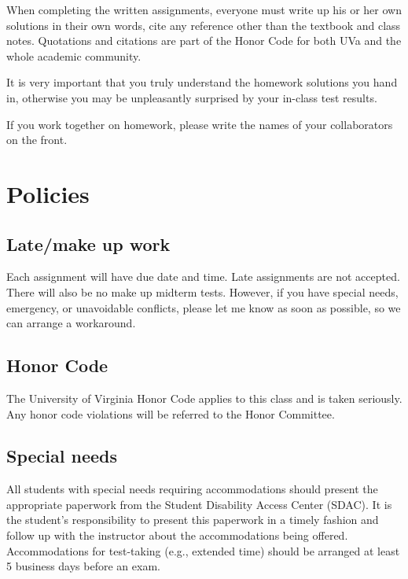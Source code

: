 \documentclass[oneside,11pt]{amsart}
\begin{document}
When completing the written assignments, everyone must write up his or her own solutions in their own words, cite any reference other than the textbook and class notes. Quotations and citations are part of the Honor Code for both UVa and the whole academic community. 

It is very important that you truly understand the homework solutions you hand in, otherwise you may be unpleasantly surprised by your in-class test results.

If you work together on homework, please write the names of your collaborators on the front.

\label{academic_integrity}

\section{Policies}

\subsection{Late/make up work}
Each assignment will have due date and time. Late assignments are not accepted. There will also be no make up midterm tests. However, if you have special needs, emergency, or unavoidable conflicts, please let me know as soon as possible, so we can arrange a workaround.

\subsection{Honor Code}
The University of Virginia Honor Code applies to this class and is taken seriously. Any honor code violations will be referred to the Honor Committee.

\subsection{Special needs}

All students with special needs requiring accommodations should present the appropriate paperwork from the Student Disability Access Center (SDAC). It is the student's responsibility to present this paperwork in a timely fashion and follow up with the instructor about the accommodations being offered. Accommodations for test-taking (e.g., extended time) should be arranged at least 5 business days before an exam.
\end{document}
